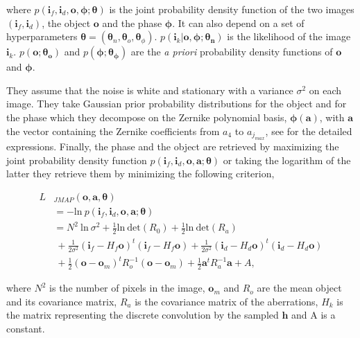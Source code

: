 where $p(\mathbf{i}_f,\mathbf{i}_d,\mathbf{o},\boldsymbol{\phi};\boldsymbol{\theta})$ is the joint probability density function of the two images $(\mathbf{i}_f,\mathbf{i}_d)$, the object $\mathbf{o}$ and the phase $\boldsymbol{\phi}$. It can also depend on a set of hyperparameters $\boldsymbol{\theta} = (\boldsymbol{\theta}_n,\boldsymbol{\theta}_o,\boldsymbol{\theta}_{\phi})$. $p(\mathbf{i}_k|\mathbf{o},\boldsymbol{\phi};\boldsymbol{\theta_n})$ is the likelihood of the image $\mathbf{i}_k$. $p(\mathbf{o};\boldsymbol{\theta_o})$ and $p(\boldsymbol{\phi};\boldsymbol{\theta_{\phi}})$ are the \textit{a priori} probability density functions of $\mathbf{o}$ and $\boldsymbol{\phi}$.

They assume that the noise is white and stationary with a variance $\sigma^2$ on each image. They take Gaussian prior probability distributions for the object and for the phase which they decompose on the Zernike polynomial basis, $\boldsymbol{\phi}(\mathbf{a})$, with $\mathbf{a}$ the vector containing the Zernike coefficients from $a_4$ to $a_{j_{max}}$, see \citet[p.18-19]{mugnier_2006} for the detailed expressions. Finally, the phase and the object are retrieved by maximizing the joint probability density function $p(\mathbf{i}_f,\mathbf{i}_d,\mathbf{o},\mathbf{a};\boldsymbol{\theta})$ or taking the logarithm of the latter they retrieve them by minimizing the following criterion,

\begin{align}
L&_{JMAP}(\mathbf{o},\mathbf{a},\boldsymbol{\theta}) \nonumber\\
&= -\mathrm{ln} \ p(\mathbf{i}_f,\mathbf{i}_d,\mathbf{o},\mathbf{a};\boldsymbol{\theta}) \nonumber \\
&= N^2\ \mathrm{ln}\ \sigma^2 + \frac{1}{2}\mathrm{ln}\ \mathrm{det}(R_0) + \frac{1}{2}\mathrm{ln}\ \mathrm{det}(R_a)\nonumber\\
& \ + \frac{1}{2\sigma^2}(\mathbf{i}_f -H_f\mathbf{o})^t(\mathbf{i}_f -H_f\mathbf{o})+ \frac{1}{2\sigma^2}(\mathbf{i}_d - H_d \mathbf{o})^t(\mathbf{i}_d-H_d\mathbf{o})\nonumber\\
& \ + \frac{1}{2}(\mathbf{o}-\mathbf{o}_m)^t R_o^{-1}(\mathbf{o}-\mathbf{o}_m) + \frac{1}{2}\mathbf{a}^tR_a^{-1}\mathbf{a} + A,
\end{align}

where $N^2$ is the number of pixels in the image, $\mathbf{o}_m$ and $R_o$ are the mean object and its covariance matrix, $R_a$ is the covariance matrix of the aberrations, $H_k$ is the matrix representing the discrete convolution by the sampled $\mathbf{h}$ and A is a constant.


